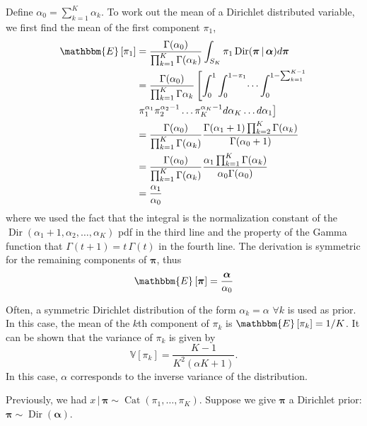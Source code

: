 \documentclass[final,3p,times,twocolumn]{elsarticle}
\DeclareMathOperator*{\Cat}{Cat}
\DeclareMathOperator*{\Dir}{Dir}
\let\bs\boldsymbol
\begin{document}
Define $\alpha_0 = \sum_{k=1}^K \alpha_k$. To work out the mean of a Dirichlet distributed variable, we first find the mean of the first component $\pi_1$,
\begin{equation}
\label{eqn:dirmean1}
\begin{split}
\mathbbm{E}\left[\pi_1\right] &= \frac{\Gamma(\alpha_0)}{\prod_{k=1}^K\Gamma(\alpha_k)} \int\nolimits_{S_K} \pi_1 \Dir(\bs \pi \,|\, \bs \alpha)d\bs\pi \\
&= \frac{\Gamma(\alpha_0)}{\prod_{k=1}^K\Gamma{\alpha_k}} \left[\int_0^1\int_0^{1-\pi_1}\dots\int_0^{1-\sum_{k=1}^{K-1}} \right.\\
& \left.\pi_1^{\alpha_1}\pi_2^{\alpha_2-1}\dots\pi_K^{\alpha_K-1}d\alpha_K \dots d\alpha_1\right]\\
&= \frac{\Gamma(\alpha_0)}{\prod_{k=1}^K\Gamma(\alpha_k)} \frac{\Gamma(\alpha_1+1)\prod_{k=2}^K\Gamma(\alpha_k)}{\Gamma(\alpha_0+1)}\\
&= \frac{\Gamma(\alpha_0)}{\prod_{k=1}^K\Gamma(\alpha_k)} \frac{\alpha_1\prod_{k=1}^K\Gamma(\alpha_k)}{\alpha_0 \Gamma(\alpha_0)}\\
&= \frac{\alpha_1}{\alpha_0}
\end{split}
\end{equation}
where we used the fact that the integral is the normalization constant of the $\Dir(\alpha_1+1,\alpha_2,\dots,\alpha_K)$ pdf in the third line and the property of the Gamma function that $\Gamma(t+1)=t\,\Gamma(t)$ in the fourth line. 
The derivation is symmetric for the remaining components of $\bs \pi$, thus 
\begin{equation}
\label{eqn:dirmean}
\mathbbm{E}\left[\bs \pi \right] = \frac{\bs \alpha}{\alpha_0}
\end{equation}

Often, a symmetric Dirichlet distribution of the form $\alpha_k = \alpha \,\,\forall k$ is used as prior.
In this case, the mean of the $k$th component of $\pi_k$ is $\mathbbm{E}\left[\pi_k\right] = 1/K$.
It can be shown that the variance of $\pi_k$ is given by
\begin{equation}
\label{eqn:dirvar}
\mathbb{V}\left[\pi_k\right] = \frac{K-1}{K^2(\alpha K + 1)}.
\end{equation}
In this case, $\alpha$ corresponds to the inverse variance of the distribution.

Previously, we had $x\,|\,\bs \pi \sim \Cat(\pi_1,\dots,\pi_K)$.
Suppose we give $\bs \pi$ a Dirichlet prior: $\bs \pi \sim \Dir(\bs \alpha)$.
\end{document}
